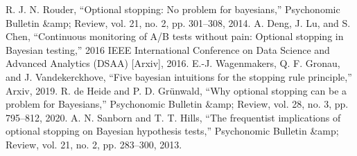 \documentclass{article}
\begin{document}




\begin{thebibliography}{1.7} 
	 \color{blue}R. J. N. Rouder, “Optional stopping: No problem for bayesians,” Psychonomic Bulletin &amp; Review, vol. 21, no. 2, pp. 301–308, 2014. \color{black}
	 \color{blue}A. Deng, J. Lu, and S. Chen, “Continuous monitoring of A/B tests without pain: Optional stopping in Bayesian testing,” 2016 IEEE International Conference on Data Science and Advanced Analytics (DSAA) [Arxiv], 2016.  \color{black}
  \color{blue} E.-J. Wagenmakers, Q. F. Gronau, and J. Vandekerckhove, “Five bayesian intuitions for the stopping rule principle,” Arxiv, 2019.  \color{black}
  \color{blue} R. de Heide and P. D. Grünwald, “Why optional stopping can be a problem for Bayesians,” Psychonomic Bulletin &amp; Review, vol. 28, no. 3, pp. 795–812, 2020. \color{black}
  \color{blue} A. N. Sanborn and T. T. Hills, “The frequentist implications of optional stopping on Bayesian hypothesis tests,” Psychonomic Bulletin &amp; Review, vol. 21, no. 2, pp. 283–300, 2013. \color{black}
	
\end{thebibliography}
\end{document}
